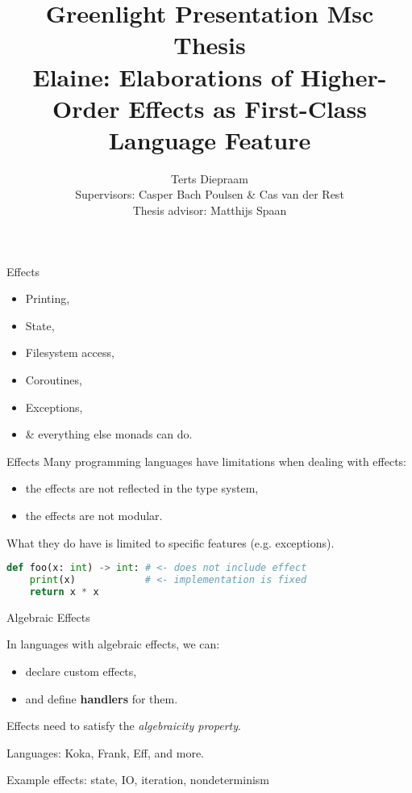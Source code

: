 \documentclass{beamer}
\title{{\small Greenlight Presentation Msc Thesis}\\Elaine: Elaborations of Higher-Order Effects as First-Class Language Feature}
\author{Terts Diepraam \\ Supervisors: Casper Bach Poulsen \& Cas van der Rest \\ Thesis advisor: Matthijs Spaan}
\begin{document}
\begin{frame}
    \titlepage
\end{frame}

\begin{frame}{Effects}
    \begin{itemize}
        \item Printing,
        \item State,
        \item Filesystem access,
        \item Coroutines,
        \item Exceptions,
        \item \& everything else monads can do.
    \end{itemize}
\end{frame}

\begin{frame}[fragile]{Effects}
Many programming languages have limitations when dealing with effects:
\begin{itemize}
    \item the effects are not reflected in the type system,
    \item the effects are not modular.
\end{itemize}

What they do have is limited to specific features (e.g. exceptions).

\begin{lstlisting}[language=python]
def foo(x: int) -> int: # <- does not include effect
    print(x)            # <- implementation is fixed
    return x * x
\end{lstlisting}
\end{frame}

\begin{frame}{Algebraic Effects}

In languages with algebraic effects, we can:

\begin{itemize}
\item declare custom effects,
\item and define \textbf{handlers} for them.
\end{itemize}

Effects need to satisfy the \emph{algebraicity property}.

Languages: Koka, Frank, Eff, and more.

Example effects: state, IO, iteration, nondeterminism
\end{frame}
\end{document}
